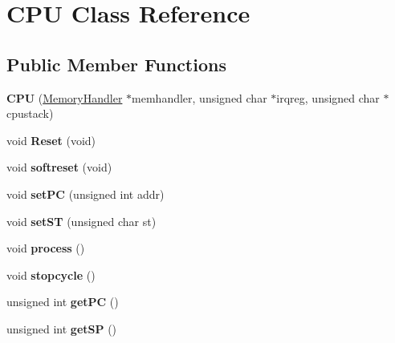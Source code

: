 \hypertarget{class_c_p_u}{}\section{C\+PU Class Reference}
\label{class_c_p_u}
\subsection*{Public Member Functions}
\begin{DoxyCompactItemize}
\item 
\mbox{\label{class_c_p_u_a53e3e3ee2b8ae1276203b509fea2dbb5}} 
{\bfseries C\+PU} (\mbox{\hyperlink{class_memory_handler}{Memory\+Handler}} $\ast$memhandler, unsigned char $\ast$irqreg, unsigned char $\ast$cpustack)
\item 
\mbox{\label{class_c_p_u_a419771ee48ade79eabce01ad5cad7c6c}} 
void {\bfseries Reset} (void)
\item 
\mbox{\label{class_c_p_u_a1ac1e913b2220e05a03eaf9d0d52e317}} 
void {\bfseries softreset} (void)
\item 
\mbox{\label{class_c_p_u_aa87d4f5a1708b406713be24dae039412}} 
void {\bfseries set\+PC} (unsigned int addr)
\item 
\mbox{\label{class_c_p_u_aca068daade4a0e8a886b562b28bfcffa}} 
void {\bfseries set\+ST} (unsigned char st)
\item 
\mbox{\label{class_c_p_u_aba90921db4c0e75b81c00c34574da41e}} 
void {\bfseries process} ()
\item 
\mbox{\label{class_c_p_u_aed14fc847e909a7a8e3e2c2ee88f529d}} 
void {\bfseries stopcycle} ()
\item 
\mbox{\label{class_c_p_u_a5eb4971607aa93adaad6486db2c5766a}} 
unsigned int {\bfseries get\+PC} ()
\item 
\mbox{\label{class_c_p_u_ad2a166f6a6d190f218c5e906527d04cd}} 
unsigned int {\bfseries get\+SP} ()
\item 
\mbox{\label{class_c_p_u_a87800ddd302457009adb2f966c299c08}} 

\end{DoxyCompactItemize}
